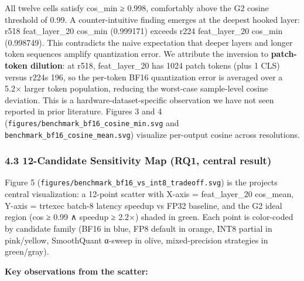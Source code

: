 \documentclass[
]{article}
\begin{document}
All twelve cells satisfy cos\_min ≥ 0.998, comfortably above the G2
cosine threshold of 0.99. A counter-intuitive finding emerges at the
deepest hooked layer: r518 feat\_layer\_20 cos\_min (0.999171) exceeds
r224 feat\_layer\_20 cos\_min (0.998749). This contradicts the naive
expectation that deeper layers and longer token sequences amplify
quantization error. We attribute the inversion to \textbf{patch-token
dilution}: at r518, feat\_layer\_20 has 1024 patch tokens (plus 1 CLS)
versus r224\textquotesingle s 196, so the per-token BF16 quantization
error is averaged over a 5.2× larger token population, reducing the
worst-case sample-level cosine deviation. This is a
hardware-dataset-specific observation we have not seen reported in prior
literature. Figures 3 and 4
(\texttt{figures/benchmark\_bf16\_cosine\_min.svg} and
\texttt{benchmark\_bf16\_cosine\_mean.svg}) visualize per-output cosine
across resolutions.

\subsubsection{4.3 12-Candidate Sensitivity Map (RQ1, central
result)}\label{43-12-candidate-sensitivity-map-rq1-central-result}

Figure 5 (\texttt{figures/benchmark\_bf16\_vs\_int8\_tradeoff.svg}) is
the project\textquotesingle s central visualization: a 12-point scatter
with X-axis = feat\_layer\_20 cos\_mean, Y-axis = trtexec batch-8
latency speedup vs FP32 baseline, and the G2 ideal region (cos ≥ 0.99 ∧
speedup ≥ 2.2×) shaded in green. Each point is color-coded by candidate
family (BF16 in blue, FP8 default in orange, INT8 partial in
pink/yellow, SmoothQuant α-sweep in olive, mixed-precision strategies in
green/gray).

\textbf{Key observations from the scatter:}
\end{document}
